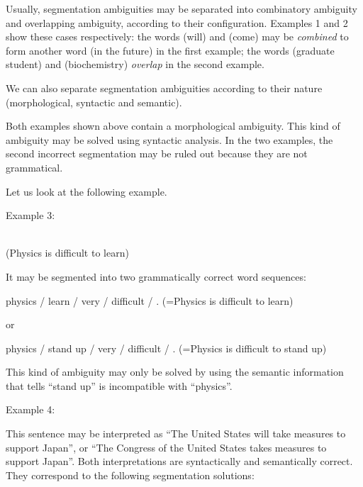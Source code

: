 Usually, segmentation ambiguities may be separated into combinatory ambiguity and overlapping ambiguity, according 
to their configuration. Examples 1 and 2 show these cases respectively: the words   (will) and   (come) may be 
{\sl combined} to form another word   (in the future) in the first example; the words   (graduate student) and 
 (biochemistry) {\sl overlap} in the second example.

We can also separate segmentation ambiguities according to their nature (morphological, syntactic and semantic).
\medskip

\smallskip

Both examples shown above contain a morphological ambiguity. This kind of ambiguity may be solved using syntactic 
analysis. In the two examples, the second incorrect segmentation may be ruled out because they are not grammatical.

\medskip
{}
\smallskip

Let us look at the following example.

\noindent Example 3:  
\begin{minipage}[t]{4in}
 \\
(Physics is difficult to learn)
\end{minipage}
\medskip

It may be segmented into two grammatically correct word sequences:


physics / learn / very / difficult / . (=Physics is difficult to learn)
\medskip

\noindent or


physics  / stand up / very / difficult / . (=Physics is difficult to stand up)
\medskip

\noindent
This kind of ambiguity may only be solved by using the semantic information that tells ``stand up'' is incompatible with 
``physics''.

\medskip
{}
\smallskip

\noindent Example 4: 
\medskip

This sentence may be interpreted as ``The United States will take measures to support Japan'', or ``The Congress of the 
United States takes measures to support Japan''. Both interpretations are syntactically and semantically correct. 
They correspond to the following segmentation solutions:

